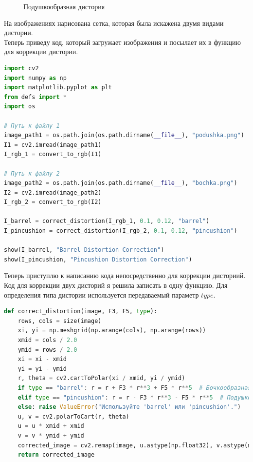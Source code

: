 \documentclass[a4paper,12pt]{article}
\begin{document}
\begin{figure}[H]
\begin{minipage}{0.48\textwidth}
        \caption{Подушкообразная дистория}
        \label{fig:reflect_oy}
    \end{minipage}
\end{figure}

На изображениях нарисована сетка, которая была искажена двумя видами дистории.\\

Теперь приведу код, который загружает изображения и посылает их в функцию для коррекции дистории.

\begin{lstlisting}[language=Python, caption=main]
import cv2
import numpy as np
import matplotlib.pyplot as plt
from defs import *
import os

# Путь к файлу 1
image_path1 = os.path.join(os.path.dirname(__file__), "podushka.png")
I1 = cv2.imread(image_path1)
I_rgb_1 = convert_to_rgb(I1)

# Путь к файлу 2
image_path2 = os.path.join(os.path.dirname(__file__), "bochka.png")
I2 = cv2.imread(image_path2)
I_rgb_2 = convert_to_rgb(I2)

I_barrel = correct_distortion(I_rgb_1, 0.1, 0.12, "barrel")
I_pincushion = correct_distortion(I_rgb_2, 0.1, 0.12, "pincushion")

show(I_barrel, "Barrel Distortion Correction")
show(I_pincushion, "Pincushion Distortion Correction")
\end{lstlisting}

Теперь приступлю к написанию кода непосредственно для коррекции дисториий. Код для коррекции двух дисторий я решила записать в одну функцию. Для определения типа дистории используется передаваемый параметр \(type\).

\begin{lstlisting}[language=Python, caption=Коррекция дисторий]
def correct_distortion(image, F3, F5, type):
    rows, cols = size(image)
    xi, yi = np.meshgrid(np.arange(cols), np.arange(rows))
    xmid = cols / 2.0
    ymid = rows / 2.0
    xi = xi - xmid
    yi = yi - ymid
    r, theta = cv2.cartToPolar(xi / xmid, yi / ymid)
    if type == "barrel": r = r + F3 * r**3 + F5 * r**5  # Бочкообразная
    elif type == "pincushion": r = r - F3 * r**3 - F5 * r**5  # Подушкообразная
    else: raise ValueError("Используйте 'barrel' или 'pincushion'.")
    u, v = cv2.polarToCart(r, theta)
    u = u * xmid + xmid
    v = v * ymid + ymid
    corrected_image = cv2.remap(image, u.astype(np.float32), v.astype(np.float32), interpolation=cv2.INTER_LINEAR,)
    return corrected_image
\end{lstlisting}    
\end{document}
